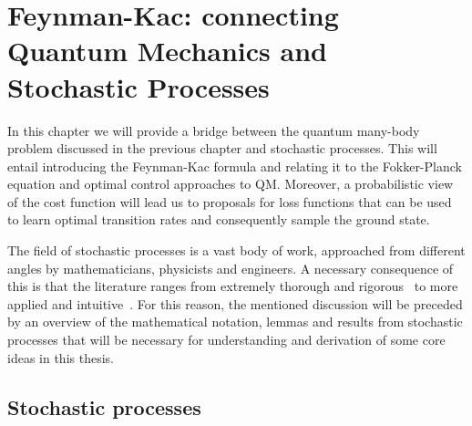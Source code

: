 
\newtheorem{theorem}{Theorem}[section]
\newtheorem{corollary}{Corollary}[theorem]
\newtheorem{lemma}[theorem]{Lemma}
\newtheorem{definition}{Definition}[section]

\chapter{Feynman-Kac: connecting Quantum Mechanics and Stochastic Processes}
\label{chapter3}

\ifpdf
    \graphicspath{{Chapter3/Figs/Raster/}{Chapter3/Figs/PDF/}{Chapter3/Figs/}}
\else
    \graphicspath{{Chapter3/Figs/Vector/}{Chapter3/Figs/}}
\fi
In this chapter we will provide a bridge between the quantum many-body problem discussed in the previous chapter and stochastic processes. This will entail introducing the Feynman-Kac formula and relating it to the Fokker-Planck equation and optimal control approaches to QM. Moreover, a probabilistic view of the cost function will lead us to proposals for loss functions that can be used to learn optimal transition rates and consequently sample the ground state.

The field of stochastic processes is a vast body of work, approached from different angles by mathematicians, physicists and engineers. A necessary consequence of this is that the literature ranges from extremely thorough and rigorous~\cite{rogers1994diffusions, rogers2000diffusions} to more applied and intuitive~\cite{sarkka2019applied}. For this reason, the mentioned discussion will be preceded by an overview of the mathematical notation, lemmas and results from stochastic processes that will be necessary for understanding and derivation of some core ideas in this thesis.

\section{Stochastic processes}
\label{subsec:fk-stoch}
